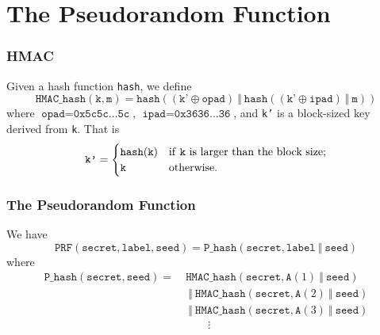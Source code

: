 \documentclass[aspectratio=169]{beamer}
\begin{document}
\section{The Pseudorandom Function}
\begin{frame}[Roundel=siiorange]
	\tocpage
\end{frame}

\begin{frame}
	\frametitle{HMAC}
	Given a hash function \texttt{hash}, we define
	\begin{equation} \nonumber
		\texttt{HMAC\_hash}(\texttt{k}, \texttt{m}) = \texttt{hash}\left((\texttt{k'} \oplus \texttt{opad}) \ \Vert \  \texttt{hash}\left((\texttt{k'} \oplus \texttt{ipad}) \ \Vert \ \texttt{m} \right)\right)
	\end{equation}
	where $\texttt{opad} = \texttt{0x5c5c\ldots 5c}$, $\texttt{ipad} = \texttt{0x3636\ldots 36}$, and \texttt{k'} is a block-sized key derived from \texttt{k}.  That is
	\begin{align*}
		\texttt{k'} &=
		\begin{cases}
			\texttt{hash}(\texttt{k}) & \text{if \texttt{k} is larger than the block size}; \\
			\texttt{k} & \text{otherwise}.
		\end{cases} \\
	\end{align*}
\end{frame}


\begin{frame}
	\frametitle{The Pseudorandom Function}
	We have
	\begin{equation} \nonumber
		\texttt{PRF}(\texttt{secret}, \texttt{label}, \texttt{seed}) = \texttt{P\_hash}(\texttt{secret}, \texttt{label} \ \Vert \  \texttt{seed})
	\end{equation}
	where
	\begin{equation} \nonumber
	\begin{split}
		\texttt{P\_hash}(\texttt{secret}, \texttt{seed}) = \ &\texttt{HMAC\_hash}(\texttt{secret}, \texttt{A}(1) \ \Vert \  \texttt{seed})\\
		&\ \Vert \ \texttt{HMAC\_hash}(\texttt{secret}, \texttt{A}(2) \ \Vert \  \texttt{seed}) \\
		&\ \Vert \ \texttt{HMAC\_hash}(\texttt{secret}, \texttt{A}(3) \ \Vert \  \texttt{seed}) \\
		&\qquad \vdots
	\end{split}
	\end{equation}
\end{frame}
\end{document}
